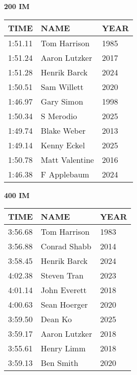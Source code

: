 \begin{minipage}[t]{0.48\textwidth}
\centering
\textbf{200 IM}\\[0.05cm]
\begin{tabular}{@{}p{1.8cm}p{2.8cm}p{1.2cm}@{}}
\hline
\textbf{TIME} & \textbf{NAME} & \textbf{YEAR} \\
\hline
1:51.11 & Tom Harrison & 1985 \\
1:51.24 & Aaron Lutzker & 2017 \\
1:51.28 & Henrik Barck & 2024 \\
1:50.51 & Sam Willett & 2020 \\
1:46.97 & Gary Simon & 1998 \\
1:50.34 & S Merodio & 2025 \\
1:49.74 & Blake Weber & 2013 \\
1:49.14 & Kenny Eckel & 2025 \\
1:50.78 & Matt Valentine & 2016 \\
1:46.38 & F Applebaum & 2024 \\
\hline
\end{tabular}
\end{minipage}\hfill
\begin{minipage}[t]{0.48\textwidth}
\centering
\textbf{400 IM}\\[0.05cm]
\begin{tabular}{@{}p{1.8cm}p{2.8cm}p{1.2cm}@{}}
\hline
\textbf{TIME} & \textbf{NAME} & \textbf{YEAR} \\
\hline
3:56.68 & Tom Harrison & 1983 \\
3:56.88 & Conrad Shabb & 2014 \\
3:58.45 & Henrik Barck & 2024 \\
4:02.38 & Steven Tran & 2023 \\
4:01.14 & John Everett & 2018 \\
4:00.63 & Sean Hoerger & 2020 \\
3:59.50 & Dean Ko & 2025 \\
3:59.17 & Aaron Lutzker & 2018 \\
3:55.61 & Henry Limm & 2018 \\
3:59.13 & Ben Smith & 2020 \\
\hline
\end{tabular}
\end{minipage}

\vspace{0.4cm}

